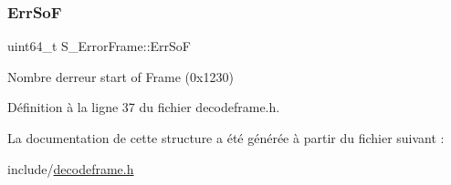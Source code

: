 \subsubsection{\texorpdfstring{Err\+SoF}{ErrSoF}}
{\footnotesize\ttfamily uint64\+\_\+t S\+\_\+\+Error\+Frame\+::\+Err\+SoF}



Nombre d\textquotesingle{}erreur start of Frame (0x1230) 



Définition à la ligne 37 du fichier decodeframe.\+h.



La documentation de cette structure a été générée à partir du fichier suivant \+:\begin{DoxyCompactItemize}
\item 
include/\hyperlink{decodeframe_8h}{decodeframe.\+h}\end{DoxyCompactItemize}
